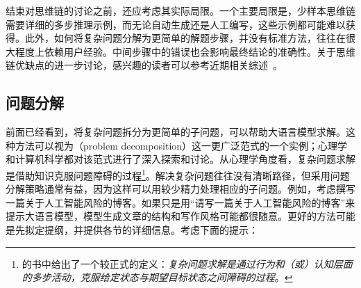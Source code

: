 结束对思维链的讨论之前，还应考虑其实际局限。一个主要局限是，少样本思维链需要详细的多步推理示例，而无论自动生成还是人工编写，这些示例都可能难以获得。此外，如何将复杂问题分解为更简单的解题步骤，并没有标准方法，往往在很大程度上依赖用户经验。中间步骤中的错误也会影响最终结论的准确性。关于思维链优缺点的进一步讨论，感兴趣的读者可以参考近期相关综述~\cite{chu-etal:2023survey,yu-etal:2023towards,zhang-etal:2023igniting}。

\subsection{问题分解}
\label{sec:problem-decomposition}

\noindent 前面已经看到，将复杂问题拆分为更简单的子问题，可以帮助大语言模型求解。这种方法可以视为（problem decomposition）这一更广泛范式的一个实例；心理学和计算机科学都对该范式进行了深入探索和讨论。从心理学角度看，复杂问题求解是借助知识克服问题障碍的过程\footnote{\citet{frensch-and-funke:2014complex} 的书中给出了一个较正式的定义：\textit{复杂问题求解是通过行为和（或）认知层面的多步活动，克服给定状态与期望目标状态之间障碍的过程}。}。解决复杂问题往往没有清晰路径，但采用问题分解策略通常有益，因为这样可以用较少精力处理相应的子问题。例如，考虑撰写一篇关于人工智能风险的博客。如果只是用“请写一篇关于人工智能风险的博客”来提示大语言模型，模型生成文章的结构和写作风格可能都很随意。更好的方法可能是先拟定提纲，并提供各节的详细信息。考虑下面的提示：

